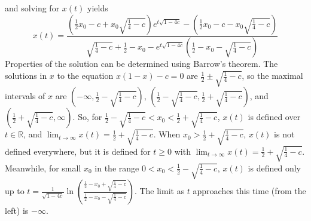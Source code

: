 \documentclass{exam}
\begin{document}
\begin{enumerate}
    and solving for $x(t)$ yields
    \begin{equation*}
        x(t) = \frac{\left(\frac{1}{2}x_{0}-c+x_{0}\sqrt{\frac{1}{4}-c}\right)e^{t\sqrt{1-4c}}-\left(\frac{1}{2}x_{0}-c-x_{0}\sqrt{\frac{1}{4}-c}\right)}{\sqrt{\frac{1}{4}-c}+\frac{1}{2}-x_{0}-e^{t\sqrt{1-4c}}\left(\frac{1}{2}-x_{0}-\sqrt{\frac{1}{4}-c}\right)}
    \end{equation*}
    Properties of the solution can be determined using Barrow's theorem. The solutions in $x$ to the equation $x(1-x) - c = 0$ are $\frac{1}{2} \pm \sqrt{\frac{1}{4} - c}$, so the maximal intervals of $x$ are $\left(-\infty, \frac{1}{2} - \sqrt{\frac{1}{4} - c}\right)$, $\left(\frac{1}{2} - \sqrt{\frac{1}{4} - c}, \frac{1}{2} + \sqrt{\frac{1}{4} - c}\right)$, and $\left(\frac{1}{2} + \sqrt{\frac{1}{4} - c}, \infty\right)$. So, for $\frac{1}{2} - \sqrt{\frac{1}{4} - c} < x_0 < \frac{1}{2} + \sqrt{\frac{1}{4} - c}$, $x(t)$ is defined over $t \in \mathbb{R}$, and $\lim_{t\to\infty}x(t) = \frac{1}{2} + \sqrt{\frac{1}{4} - c}$. When $x_0 > \frac{1}{2} + \sqrt{\frac{1}{4} - c}$, $x(t)$ is not defined everywhere, but it is defined for $t \geq 0$ with $\lim_{t\to\infty}x(t) = \frac{1}{2} + \sqrt{\frac{1}{4} - c}$. Meanwhile, for small $x_0$ in the range $0 < x_0 < \frac{1}{2} - \sqrt{\frac{1}{4} - c}$, $x(t)$ is defined only up to $t = \frac{1}{\sqrt{1-4c}}\ln\left(\frac{\frac{1}{2}-x_0+\sqrt{\frac{1}{4}-c}}{\frac{1}{2}-x_0-\sqrt{\frac{1}{4}-c}}\right)$. The limit as $t$ approaches this time (from the left) is $-\infty$.
\end{enumerate}
\end{document}
